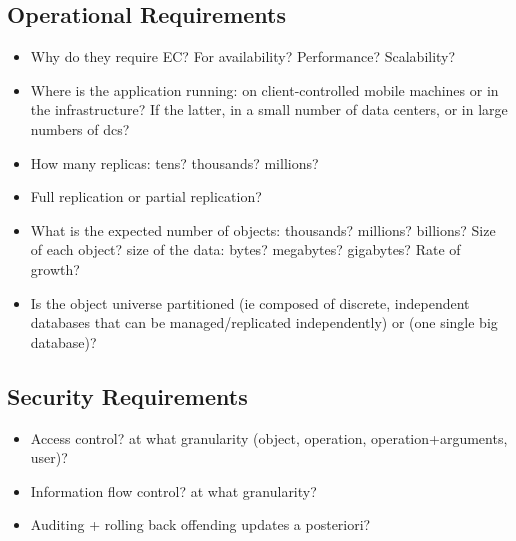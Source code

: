 \documentclass[11pt,a4paper]{report}
\begin{document}
\subsection{Operational Requirements}
\begin{itemize}
\item Why do they require EC?  For availability?  Performance?  Scalability?
\item Where is the application running: on client-controlled mobile machines or in the infrastructure? If the latter, in a small number of data centers, or in large numbers of \glspl{dc}?
\item How many replicas: tens?  thousands?  millions?
\item Full replication or partial replication?
\item What is the expected number of objects: thousands? millions? billions?  Size of each object?  size of the data: bytes? megabytes? gigabytes?  Rate of growth?
\item Is the object universe partitioned (ie composed of discrete, independent databases that can be managed/replicated independently) or (one single big database)?
\end{itemize}

\subsection{Security Requirements}
\begin{itemize}
\item Access control?  at what granularity (object, operation, operation+arguments, user)?
\item Information flow control?  at what granularity?
\item Auditing + rolling back offending updates a posteriori?
\end{itemize}

\label{LastPage}
\end{document}
